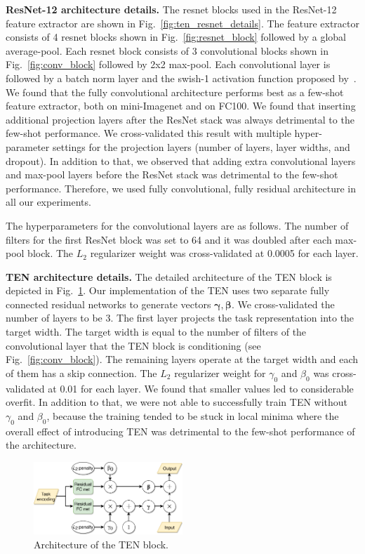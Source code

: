 \documentclass{article}
\begin{document}
\textbf{ResNet-12 architecture details.} The resnet blocks used in the ResNet-12 feature extractor are shown in Fig.~\ref{fig:ten_resnet_details}. The feature extractor consists of 4 resnet blocks shown in Fig.~\ref{fig:resnet_block} followed by a global average-pool. Each resnet block consists of 3 convolutional blocks shown in Fig.~\ref{fig:conv_block} followed by 2x2 max-pool. Each convolutional layer is followed by a batch norm layer and the swish-1 activation function proposed by~\citet{Ramachandran2017searching}. We found that the fully convolutional architecture performs best as a few-shot feature extractor, both on mini-Imagenet and on FC100. We found that inserting additional projection layers after the ResNet stack was always detrimental to the few-shot performance. We cross-validated this result with multiple hyper-parameter settings for the projection layers (number of layers, layer widths, and dropout). In addition to that, we observed that adding extra convolutional layers and max-pool layers before the ResNet stack was detrimental to the few-shot performance. Therefore, we used fully convolutional, fully residual architecture in all our experiments.

The hyperparameters for the convolutional layers are as follows. The number of filters for the first ResNet block was set to 64 and it was doubled after each max-pool block. The $L_2$ regularizer weight was cross-validated at 0.0005 for each layer.

\textbf{TEN architecture details.} The detailed architecture of the TEN block is depicted in Fig.~\ref{fig:tbn_block}. Our implementation of the TEN uses two separate fully connected residual networks to generate vectors $\bm{\gamma}, \bm{\beta}$. We cross-validated the number of layers to be 3. The first layer projects the task representation into the target width. The target width is equal to the number of filters of the convolutional layer that the TEN block is conditioning (see Fig.~\ref{fig:conv_block}). The remaining layers operate at the target width and each of them has a skip connection. The $L_2$ regularizer weight for $\gamma_0$ and $\beta_0$  was cross-validated at 0.01 for each layer. We found that smaller values led to considerable overfit. In addition to that, we were not able to successfully train TEN without $\gamma_0$ and $\beta_0$, because the training tended to be stuck in local minima where the overall effect of introducing TEN was detrimental to the few-shot performance of the architecture.

\begin{figure}[t]
    \centering
    \includegraphics[width=0.5\textwidth]{cbn_block.pdf}
    \caption{Architecture of the TEN block.}
    \label{fig:tbn_block}
\end{figure}
\end{document}
